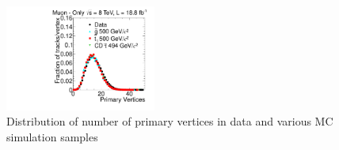 \begin{figure}
  \begin{center}
      \includegraphics[clip=true, trim=0.0cm 0cm 3.0cm 0cm, width=0.44\textwidth]{figures/muonly/Selection_Comp_Signal_8TeV_PV_BS} \\
        {Distribution of number of primary vertices in data and various MC simulation samples
        }
      \label{fig:PV}
  \end{center}
\end{figure}